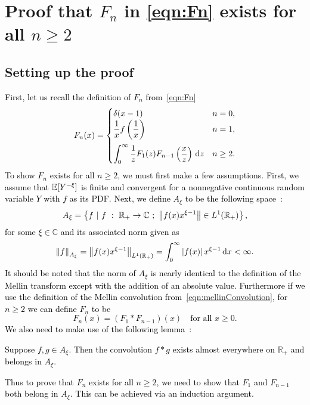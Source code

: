 \chapter{Proof that $F_n$ in \eqref{eqn:Fn} exists for all $n \geq 2$}

\section{Setting up the proof}
\textcolor{black}{
First, let us recall the definition of $F_n$ from~\eqref{eqn:Fn}
	\begin{equation*}
		F_n(x) =
			\begin{cases}
				\ds\delta(x-1) & n = 0, \\ \vspace{0.2cm}
				\ds\fr{1}{x}f\left(\fr{1}{x}\right) & n = 1, \\
				\ds\int_0^\infty \fr{1}{z}F_1(z)F_{n-1}\left(\fr{x}{z}\right) \, \d z & n \geq 2.
			\end{cases}
	\end{equation*}
To show $F_n$ exists for all $n \geq 2$, we must first make a few assumptions. First, we assume that $\mathbb E[Y^{-\xi}]$ is finite and convergent for a nonnegative continuous random variable $Y$ with $f$ as its PDF. Next, we define $A_{\xi}$ to be the following space~\cite{kilicman2004}:
	\begin{equation*}
		A_\xi = \left\{ f \ | \ f \ : \ \mathbb{R}_{+} \rightarrow \mathbb{C} \ ; \ \norm {f(x)x^{\xi-1}} \in L^1(\mathbb{R_{+}}) \right\},
	\end{equation*}
for some $\xi \in \mathbb{C}$ and its associated norm given as
	\begin{equation*}
		\left\lVert f \right\rVert_{A_\xi} = \left\lVert f(x)x^{\xi-1}\right\rVert_{L^1(\mathbb{R}_{+})} = \int_0^\infty \left| f(x) \right|x^{\xi-1} \, \mathrm d x < \infty.
	\end{equation*}
It should be noted that the norm of $A_\xi$ is nearly identical to the definition of the Mellin transform except with the addition of an absolute value. Furthermore if we use the definition of the Mellin convolution from~\eqref{eqn:mellinConvolution}, for $n \geq 2$ we can define $F_n$ to be 
	\begin{equation}
		\label{eqn:FnConv}
		F_n(x) = (F_1 \ast F_{n-1})(x) \quad \text{for all $x \geq 0$}.
	\end{equation}
We also need to make use of the following lemma~\cite{kilicman2004}:
\begin{lemma}
\label{lem:convLemma}
Suppose $f, g \in A_\xi$. Then the convolution $f\ast g$ exists almost everywhere on $\mathbb{R_{+}}$ and belongs in $A_\xi$. 
\end{lemma}
Thus to prove that $F_n$ exists for all $n \geq 2$, we need to show that $F_1$ and $F_{n-1}$ both belong in $A_\xi$. This can be achieved via an induction argument.
}
